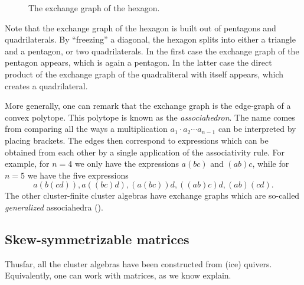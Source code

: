 \begin{example}
\begin{figure}[ht!]
		\caption{The exchange graph of the hexagon.}
		\label{fig:hexagon_exchange_graph}
	\end{figure}

	Note that the exchange graph of the hexagon is built out of pentagons and
	quadrilaterals. By ``freezing'' a diagonal, the hexagon splits into either a triangle
	and a pentagon, or two quadrilaterals. In the first case the exchange graph of the
	pentagon appears, which is again a pentagon. In the latter case the direct product of
	the exchange graph of the quadraliteral with itself appears, which creates a
	quadrilateral.

	More generally, one can remark that the exchange graph is the edge-graph of a convex
	polytope. This polytope is known as the \emph{associahedron}. The
	name comes from comparing all the ways a multiplication $a_1 \cdot a_2 \cdots a_{n-1}$
	can be interpreted by placing brackets. The edges then correspond to expressions which
	can be obtained from each other by a single application of the associativity rule. For
	example, for $n=4$ we only have the expressions $a(bc)$ and $(ab)c$, while for $n=5$ we
	have the five expressions
	\begin{equation*}
		a(b(cd)), a((bc)d), (a(bc))d, ((ab)c)d, (ab)(cd).
	\end{equation*}
	The other cluster-finite cluster algebras have exchange graphs which are so-called
	\emph{generalized} associahedra (\cite[Theorem 1.13]{FominZelevinsky2003CAFin}).
\end{example}

\subsection{Skew-symmetrizable matrices}

Thusfar, all the cluster algebras have been constructed from (ice) quivers.
Equivalently, one can work with matrices, as we know explain.

